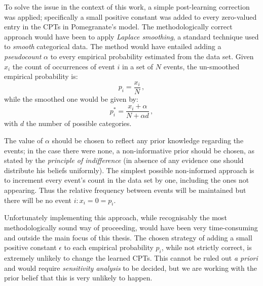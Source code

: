 To solve the issue in the context of this work, a simple post-learning correction was applied; specifically a small positive constant was added to every zero-valued entry in the CPTs in Pomegranate's model.
The methodologically correct approach would have been to apply \textit{Laplace smoothing}, a standard technique used to \textit{smooth} categorical data.
The method would have entailed adding a \textit{pseudocount} $\alpha$ to every empirical probability estimated from the data set.
Given $x_i$ the count of occurrences of event $i$ in a set of $N$ events, the un-smoothed empirical probability is:
\begin{equation}
	p_i = \frac{x_{i}}{N} \,,
\end{equation}
while the smoothed one would be given by:
\begin{equation}
	p_i^*=\frac{x_{i}+\alpha}{N+\alpha d} \,,
\end{equation}
with $d$ the number of possible categories.

The value of $\alpha$ should be chosen to reflect any prior knowledge regarding the events; in the case there were none, a non-informative prior should be chosen, as stated by the \textit{principle of indifference} (in absence of any evidence one should distribute his beliefs uniformly).
The simplest possible non-informed approach is to increment every event's count in the data set by one, including the ones not appearing.
Thus the relative frequency between events will be maintained but there will be no event $i : x_i=0=p_i$.

Unfortunately implementing this approach, while recognisably the most methodologically sound way of proceeding, would have been very time-consuming and outside the main focus of this thesis.
The chosen strategy of adding a small positive constant $\epsilon$ to each empirical probability $p_i$, while not strictly correct, is extremely unlikely to change the learned CPTs.
This cannot be ruled out \textit{a priori} and would require \textit{sensitivity analysis} to be decided, but we are working with the prior belief that this is very unlikely to happen.

